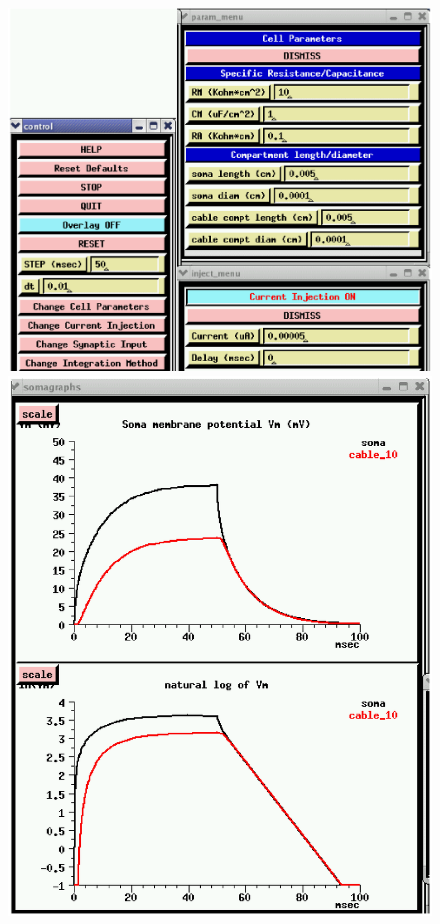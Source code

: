 \documentclass[12pt]{article}
\begin{document}
\begin{figure}[h]
\centering
\begin{minipage}{0.5\textwidth}
 \centerline{\includegraphics[scale=0.38]{figures/cable1-inj5.eps}}
  \end{minipage}
\begin{minipage}{0.45\textwidth}
 \centerline{\includegraphics[scale=0.3]{figures/cable2-inj5.eps}}
  \end{minipage}
  \label{fig:cableinj}
\end{figure}
\end{document}
